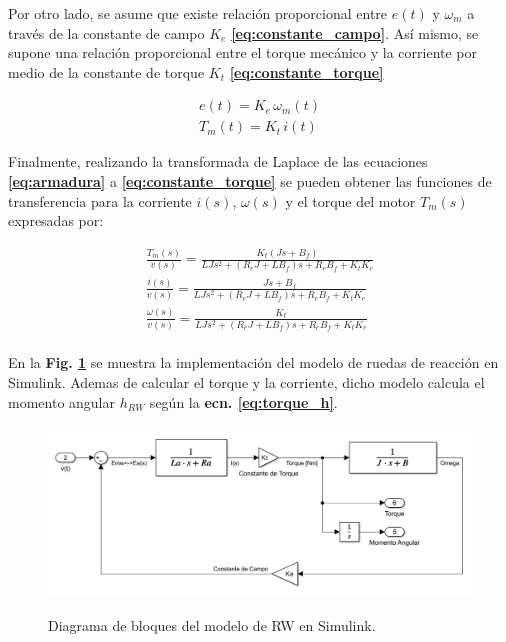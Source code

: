 Por otro lado, se asume que existe relación proporcional entre $e(t)$ y $\omega_m$ a través de la constante de campo $K_e$ \textbf{\eqref{eq:constante_campo}}. Así mismo, se supone una relación proporcional entre el torque mecánico y la corriente por medio de la constante de torque $K_t$ \textbf{\eqref{eq:constante_torque}}

\begin{gather}
	e(t) = K_e\,\omega_m(t)\label{eq:constante_campo}\\[10pt]
	T_m(t) = K_t\,i(t)\label{eq:constante_torque}
\end{gather}

Finalmente, realizando la transformada de Laplace de las ecuaciones \textbf{\eqref{eq:armadura}} a \textbf{\eqref{eq:constante_torque}} se pueden obtener las funciones de transferencia para la corriente $i(s)$, $\omega(s)$ y el torque del motor $T_m(s)$ expresadas por: 

\begin{gather}
	\frac{T_m(s)}{v(s)}= \frac{K_t\left(Js+B_f\right)}{LJs^2 + \left(R_eJ+LB_f\right)s +R_eB_f+K_tK_e}\label{eq:trans_torque_voltaje}\\[10pt]	
	\frac{i(s)}{v(s)}= \frac{Js+B_f}{LJs^2 + \left(R_eJ+LB_f\right)s +R_eB_f+K_tK_e}\label{eq:trans_i_voltaje}\\[10pt]
	\frac{\omega(s)}{v(s)}= \frac{K_t}{LJs^2 + \left(R_eJ+LB_f\right)s +R_eB_f+K_tK_e}\label{eq:trans_omega_voltaje}
\end{gather}
\\

En la \textbf{Fig. \ref{fig:bloquesRW}} se muestra la implementación del modelo de ruedas de reacción en Simulink. Ademas de calcular el torque y la corriente, dicho modelo calcula el momento angular $h_{RW}$ según la \textbf{ecn. \eqref{eq:torque_h}}.

\begin{figure}[!ht]
	\begin{center}
		\includegraphics[scale=0.5]{imagenes/modelo_dinamico/bloquesRW.PNG}\\
	\end{center}
	\caption{Diagrama de bloques del modelo de RW en Simulink.}
	\label{fig:bloquesRW}
	\textit{}
\end{figure}

